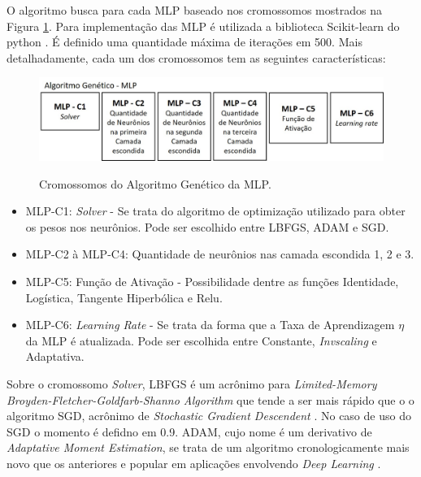 O algoritmo busca para cada MLP baseado nos cromossomos mostrados na Figura \ref{fig:cap3_cromo_mlp}. Para implementação das MLP é utilizada a biblioteca Scikit-learn do python \cite{scikit-learn}. É definido uma quantidade máxima de iterações em 500. Mais detalhadamente, cada um dos cromossomos tem as seguintes características:

\begin{figure}[!htbp]
    \centering
    \caption{Cromossomos do Algoritmo Genético da MLP.}
    \includegraphics[width=\textwidth]{Figuras/mat_e_met/cromo_mlp.jpg}
    \label{fig:cap3_cromo_mlp}
\end{figure}

\begin{itemize}
    \item MLP-C1: \textit{Solver} - Se trata do algoritmo de optimização utilizado para obter os pesos nos neurônios. Pode ser escolhido entre LBFGS, ADAM e SGD. 
    
    \item MLP-C2 à MLP-C4: Quantidade de neurônios nas camada escondida 1, 2 e 3.
    
    \item MLP-C5: Função de Ativação - Possibilidade dentre as funções Identidade, Logística, Tangente Hiperbólica e Relu.
    
    \item MLP-C6: \textit{Learning Rate} - Se trata da forma que a Taxa de Aprendizagem $\eta$ da MLP é atualizada. Pode ser escolhida entre Constante, \textit{Invscaling} e Adaptativa.
    
\end{itemize}

Sobre o cromossomo \textit{Solver}, LBFGS é um acrônimo para \textit{Limited\hyp{}Memory Broyden\hyp{}Fletcher\hyp{}Goldfarb\hyp{}Shanno Algorithm} que tende a ser mais rápido que o o algoritmo SGD, acrônimo de \textit{Stochastic Gradient Descendent} \cite{le2011optimization}. No caso de uso do SGD o momento é defidno em 0.9. ADAM, cujo nome é um derivativo de \textit{Adaptative Moment Estimation}, se trata de um algoritmo cronologicamente mais novo que os anteriores e popular em aplicações envolvendo \textit{Deep Learning} \cite{kingma2014adam, yi2020effective, jais2019adam}.

